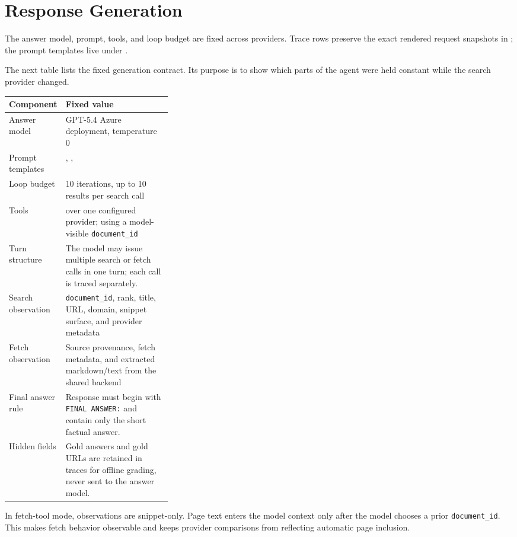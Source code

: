 \section{Response Generation}
\label{app:generation}
\label{app:agent-contract}
The answer model, prompt, tools, and loop budget are fixed across providers. Trace rows preserve the exact rendered request snapshots in ; the prompt templates live under .

The next table lists the fixed generation contract. Its purpose is to show which parts of the agent were held constant while the search provider changed.

\begin{center}
\footnotesize
\begin{tabularx}{\linewidth}{@{}L{0.32\linewidth}Z@{}}
\toprule
\textbf{Component} & \textbf{Fixed value} \\
\midrule
Answer model & GPT-5.4 Azure deployment, temperature 0 \\
Prompt templates & , ,  \\
Loop budget & 10 iterations, up to 10 results per search call \\
Tools & \searchWeb{} over one configured provider; \fetchPage{} using a model-visible \texttt{document\_id} \\
Turn structure & The model may issue multiple search or fetch calls in one turn; each call is traced separately. \\
Search observation & \texttt{document\_id}, rank, title, URL, domain, snippet surface, and provider metadata \\
Fetch observation & Source provenance, fetch metadata, and extracted markdown/text from the shared backend \\
Final answer rule & Response must begin with \texttt{FINAL ANSWER:} and contain only the short factual answer. \\
Hidden fields & Gold answers and gold URLs are retained in traces for offline grading, never sent to the answer model. \\
\bottomrule
\end{tabularx}
\end{center}

In fetch-tool mode, \searchWeb{} observations are snippet-only. Page text enters the model context only after the model chooses a prior \texttt{document\_id}. This makes fetch behavior observable and keeps provider comparisons from reflecting automatic page inclusion.

